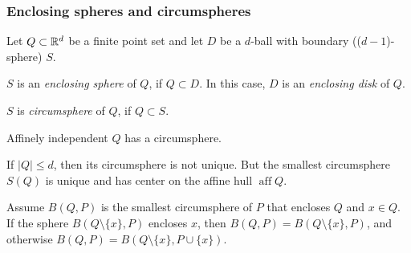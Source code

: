 \begin{multicols*}{3}
\subsubsection{Enclosing spheres and circumspheres}\vspace{-0.15pc}
Let $Q\subset \mathbb{R}^d$ be a finite point set and let $D$ be a $d$-ball with boundary (($d-1$)-sphere) $S$.\vspace{-0.6pc}
\begin{definition}$S$ is an \emph{enclosing sphere} of $Q$, if $Q\subset D$. In this case, $D$ is an \emph{enclosing disk} of $Q$.
\end{definition}
\rspace
\begin{definition}[Circumsphere] $S$ is \emph{circumsphere} of $Q$, if $Q\subset S$.
\end{definition}
\rspace
\begin{remark}
Affinely independent $Q$ has a circumsphere. 
\end{remark}
\rspace
\begin{rem}If $|Q| \leq d$, then its circumsphere is not unique. But the smallest circumsphere $S(Q)$ is unique and has center on  the affine hull $\operatorname{aff} Q$.
\end{rem}
\rspace
\begin{remark}
Assume $B(Q,P)$ is the smallest circumsphere of $P$ that encloses $Q$ and $x\in Q$. If the sphere $B(Q \setminus \{x\},P)$  encloses $x$, then ${ B(Q,P) = B(Q \setminus \{x\},P)}$, and otherwise ${ B(Q,P) = B(Q \setminus \{x\},P \cup \{x\})}$.
\end{remark}
\rspace
\drawaline\\\vspace{-0.5pc}

\end{multicols*}
